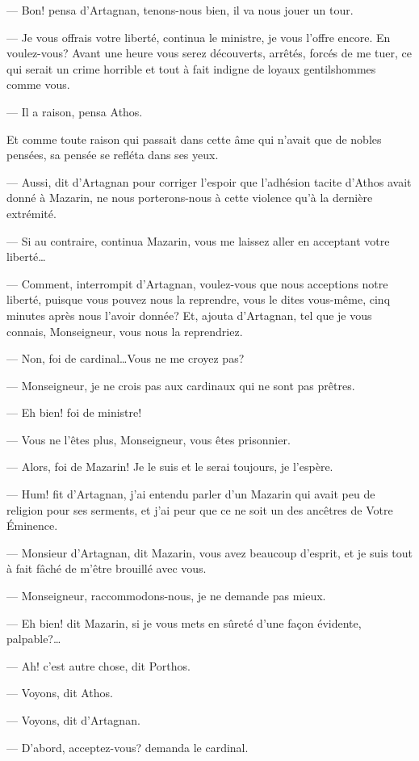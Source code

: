 — Bon! pensa d'Artagnan, tenons-nous bien, il va nous jouer un tour.

— Je vous offrais votre liberté, continua le ministre, je vous l'offre encore. En voulez-vous? Avant une heure vous serez découverts, arrêtés, forcés de me tuer, ce qui serait un crime horrible et tout à fait indigne de loyaux gentilshommes comme vous.

— Il a raison, pensa Athos.

Et comme toute raison qui passait dans cette âme qui n'avait que de nobles pensées, sa pensée se refléta dans ses yeux.

— Aussi, dit d'Artagnan pour corriger l'espoir que l'adhésion tacite d'Athos avait donné à Mazarin, ne nous porterons-nous à cette violence qu'à la dernière extrémité.

— Si au contraire, continua Mazarin, vous me laissez aller en acceptant votre liberté\dots

— Comment, interrompit d'Artagnan, voulez-vous que nous acceptions notre liberté, puisque vous pouvez nous la reprendre, vous le dites vous-même, cinq minutes après nous l'avoir donnée? Et, ajouta d'Artagnan, tel que je vous connais, Monseigneur, vous nous la reprendriez.

— Non, foi de cardinal\dots Vous ne me croyez pas?

— Monseigneur, je ne crois pas aux cardinaux qui ne sont pas prêtres.

— Eh bien! foi de ministre!

— Vous ne l'êtes plus, Monseigneur, vous êtes prisonnier.

— Alors, foi de Mazarin! Je le suis et le serai toujours, je l'espère.

— Hum! fit d'Artagnan, j'ai entendu parler d'un Mazarin qui avait peu de religion pour ses serments, et j'ai peur que ce ne soit un des ancêtres de Votre Éminence.

— Monsieur d'Artagnan, dit Mazarin, vous avez beaucoup d'esprit, et je suis tout à fait fâché de m'être brouillé avec vous.

— Monseigneur, raccommodons-nous, je ne demande pas mieux.

— Eh bien! dit Mazarin, si je vous mets en sûreté d'une façon évidente, palpable?\dots

— Ah! c'est autre chose, dit Porthos.

— Voyons, dit Athos.

— Voyons, dit d'Artagnan.

— D'abord, acceptez-vous? demanda le cardinal.

